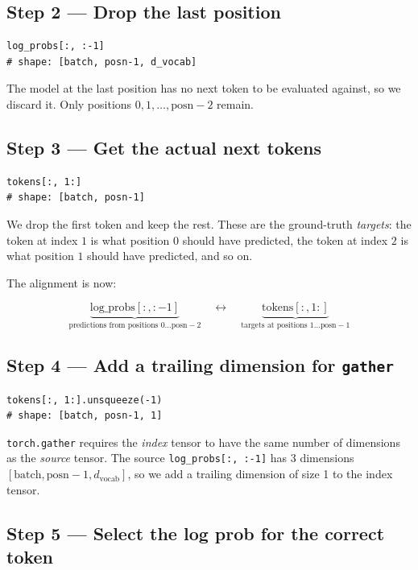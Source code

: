 \documentclass[10pt]{article}
\begin{document}
\subsection{Step 2 --- Drop the last position}

\begin{lstlisting}
log_probs[:, :-1]
# shape: [batch, posn-1, d_vocab]
\end{lstlisting}

The model at the last position has no next token to be evaluated against,
so we discard it. Only positions $0, 1, \ldots, \text{posn}-2$ remain.

\subsection{Step 3 --- Get the actual next tokens}

\begin{lstlisting}
tokens[:, 1:]
# shape: [batch, posn-1]
\end{lstlisting}

We drop the first token and keep the rest. These are the ground-truth
\emph{targets}: the token at index $1$ is what position $0$ should have
predicted, the token at index $2$ is what position $1$ should have predicted,
and so on.

\medskip
\noindent The alignment is now:

\[
  \underbrace{\text{log\_probs}[:, :-1]}_{\text{predictions from positions } 0 \ldots \text{posn}-2}
  \quad \longleftrightarrow \quad
  \underbrace{\text{tokens}[:, 1:]}_{\text{targets at positions } 1 \ldots \text{posn}-1}
\]

\subsection{Step 4 --- Add a trailing dimension for \texttt{gather}}

\begin{lstlisting}
tokens[:, 1:].unsqueeze(-1)
# shape: [batch, posn-1, 1]
\end{lstlisting}

\texttt{torch.gather} requires the \emph{index} tensor to have the same number
of dimensions as the \emph{source} tensor.
The source \texttt{log\_probs[:, :-1]} has 3 dimensions
$[\text{batch}, \text{posn}-1, d_\text{vocab}]$, so we add a trailing
dimension of size 1 to the index tensor.

\subsection{Step 5 --- Select the log prob for the correct token}
\end{document}
